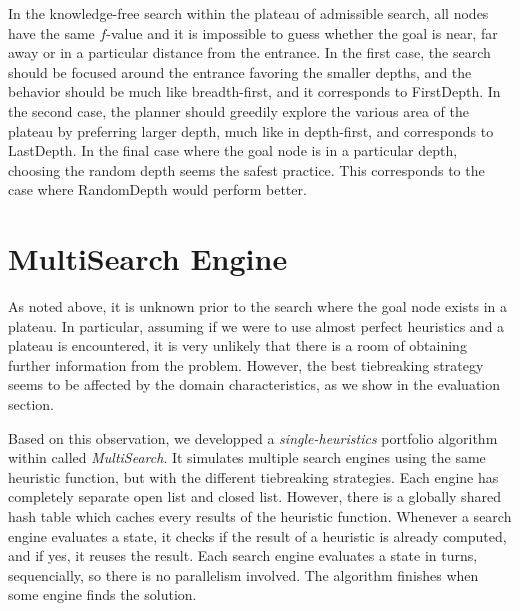 In the knowledge-free search within the
plateau of admissible search, all nodes have the same $f$-value and it
is impossible to guess whether the goal is near, far away or in a
particular distance from the entrance. In the first case, the search
should be focused around the entrance favoring the smaller depths, and
the behavior should be much like breadth-first, and it corresponds to
FirstDepth. In the second case, the planner should greedily explore the
various area of the plateau by preferring larger depth, much like in
depth-first, and corresponds to LastDepth. In the final case where the
goal node is in a particular depth, choosing the random depth seems the
safest practice. This corresponds to the case where RandomDepth would
perform better.



 
\section{MultiSearch Engine}

As noted above, it is unknown prior to the search where the goal node
exists in a plateau. In particular, assuming if we were to use almost
perfect heuristics and a plateau is encountered, it is very unlikely
that there is a room of obtaining further information from the problem.
However, the best tiebreaking strategy seems to be affected by the domain
characteristics, as we show in the evaluation section.

Based on this observation, we developped a \emph{single-heuristics} portfolio
algorithm within \astar called \emph{MultiSearch}.  It simulates
multiple search engines using the same heuristic function, but with the
different tiebreaking strategies.  Each engine has completely separate
open list and closed list.  However, there is a globally shared hash
table which caches every results of the heuristic function.  Whenever a
search engine evaluates a state, it checks if the result of a heuristic is
already computed, and if yes, it reuses the result.  Each search engine
evaluates a state in turns, sequencially, so there is no parallelism
involved. The algorithm finishes when some engine finds the solution.

